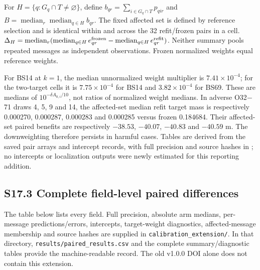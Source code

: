 \documentclass[journal,onecolumn,10pt]{IEEEtran}
\begin{document}
For $H=\{q:G_q\cap T\ne\varnothing\}$, define $b_{qr}=\sum_{i\in G_q\cap T}p_{qir}$ and $B=\operatorname{median}_r\operatorname{median}_{q\in H}b_{qr}$. The fixed affected set is defined by reference selection and is identical within and across the 32 refit/frozen pairs in a cell. $\Delta_H=\operatorname{median}_r(\operatorname{median}_{q\in H}e^{\rm frozen}_{qr}-\operatorname{median}_{q\in H}e^{\rm refit}_{qr})$. Neither summary pools repeated messages as independent observations. Frozen normalized weights equal reference weights.




For BS14 at $k=1$, the median unnormalized weight multiplier is $7.41\times10^{-4}$; for the two-target cells it is $7.75\times10^{-4}$ for BS14 and $3.82\times10^{-4}$ for BS69. These are medians of $10^{-\delta A_{0,i}/10}$, not ratios of normalized weight medians. In adverse O32$-$71 draws 4, 5, 9 and 14, the affected-set median refit target mass is respectively 0.000270, 0.000287, 0.000283 and 0.000285 versus frozen 0.184684. Their affected-set paired benefits are respectively $-38.53$, $-40.07$, $-40.83$ and $-40.59$ m. The downweighting therefore persists in harmful cases. Tables are derived from the saved pair arrays and intercept records, with full precision and source hashes in ; no intercepts or localization outputs were newly estimated for this reporting addition.

\subsection*{S17.3 Complete field-level paired differences}
The table below lists every field. Full precision, absolute arm medians, per-message predictions/errors, intercepts, target-weight diagnostics, affected-message membership and source hashes are supplied in \texttt{calibration\_extension/}. In that directory, \texttt{results/paired\_results.csv} and the complete summary/diagnostic tables provide the machine-readable record. The old v1.0.0 DOI alone does not contain this extension.
\end{document}
